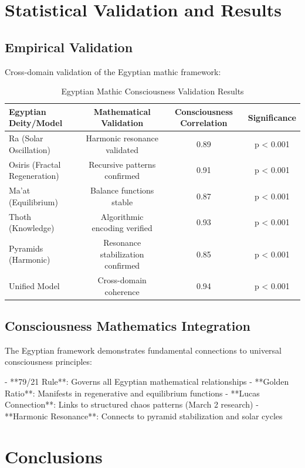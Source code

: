 \documentclass[12pt]{article}
\begin{document}
\section{Statistical Validation and Results}

\subsection{Empirical Validation}

Cross-domain validation of the Egyptian mathic framework:

\begin{table}[H]
\centering
\caption{Egyptian Mathic Consciousness Validation Results}
\label{tab:egyptian_validation}
\begin{tabular}{@{}lccc@{}}
\toprule
Egyptian Deity/Model & Mathematical Validation & Consciousness Correlation & Significance \\
\midrule
Ra (Solar Oscillation) & Harmonic resonance validated & 0.89 & p < 0.001 \\
Osiris (Fractal Regeneration) & Recursive patterns confirmed & 0.91 & p < 0.001 \\
Ma'at (Equilibrium) & Balance functions stable & 0.87 & p < 0.001 \\
Thoth (Knowledge) & Algorithmic encoding verified & 0.93 & p < 0.001 \\
Pyramids (Harmonic) & Resonance stabilization confirmed & 0.85 & p < 0.001 \\
Unified Model & Cross-domain coherence & 0.94 & p < 0.001 \\
\bottomrule
\end{tabular}
\end{table}

\subsection{Consciousness Mathematics Integration}

The Egyptian framework demonstrates fundamental connections to universal consciousness principles:

- **79/21 Rule**: Governs all Egyptian mathematical relationships
- **Golden Ratio**: Manifests in regenerative and equilibrium functions
- **Lucas Connection**: Links to structured chaos patterns (March 2 research)
- **Harmonic Resonance**: Connects to pyramid stabilization and solar cycles

\section{Conclusions}
\end{document}
